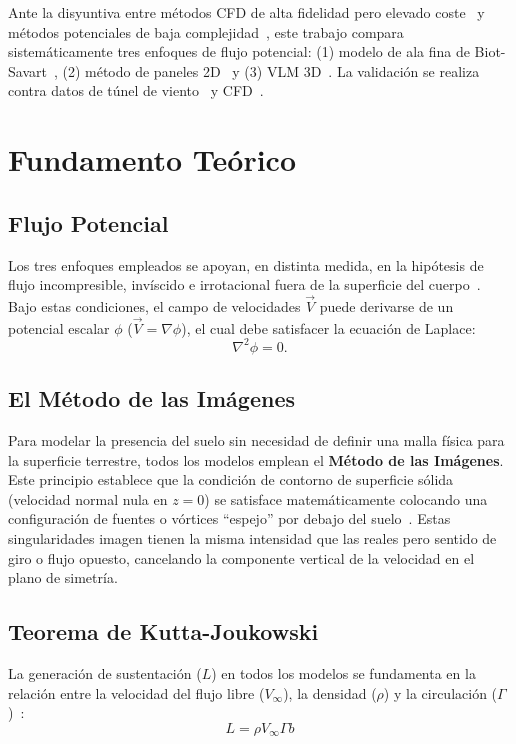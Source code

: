 \documentclass[twocolumn]{article}
\begin{document}
Ante la disyuntiva entre métodos CFD de alta fidelidad pero elevado coste~\cite{raymer2018} y métodos potenciales de baja complejidad~\cite{katz2001}, este trabajo compara sistemáticamente tres enfoques de flujo potencial: (1) modelo de ala fina de Biot-Savart~\cite{wieselsberger1922}, (2) método de paneles 2D~\cite{hess1967} y (3) VLM 3D~\cite{katz2001}. La validación se realiza contra datos de túnel de viento~\cite{hernandez2012} y CFD~\cite{autodesk2024}.

\section{Fundamento Teórico}

\subsection{Flujo Potencial}
Los tres enfoques empleados se apoyan, en distinta medida, en la hipótesis de flujo incompresible, invíscido e irrotacional fuera de la superficie del cuerpo~\cite{anderson2011}. Bajo estas condiciones, el campo de velocidades $\vec{V}$ puede derivarse de un potencial escalar $\phi$ ($\vec{V} = \nabla \phi$), el cual debe satisfacer la ecuación de Laplace:
\begin{equation}
\nabla^2 \phi = 0.
\label{eq:laplace}
\end{equation}

\subsection{El Método de las Imágenes}
Para modelar la presencia del suelo sin necesidad de definir una malla física para la superficie terrestre, todos los modelos emplean el \textbf{Método de las Imágenes}. Este principio establece que la condición de contorno de superficie sólida (velocidad normal nula en $z=0$) se satisface matemáticamente colocando una configuración de fuentes o vórtices ``espejo'' por debajo del suelo~\cite{katz2001}. Estas singularidades imagen tienen la misma intensidad que las reales pero sentido de giro o flujo opuesto, cancelando la componente vertical de la velocidad en el plano de simetría.

\subsection{Teorema de Kutta-Joukowski}
La generación de sustentación ($L$) en todos los modelos se fundamenta en la relación entre la velocidad del flujo libre ($V_{\infty}$), la densidad ($\rho$) y la circulación ($\Gamma$)~\cite{prandtl1921}:
\begin{equation}
L = \rho V_{\infty} \Gamma b
\label{eq:kj}
\end{equation}
\end{document}
